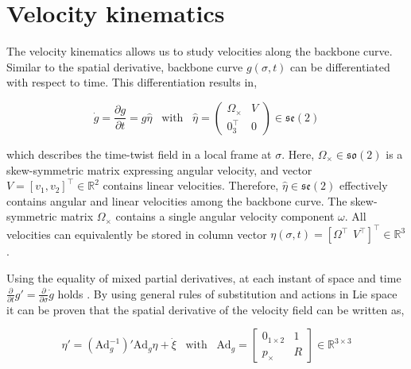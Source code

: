 \section{Velocity kinematics}

The velocity kinematics allows us to study velocities along the backbone curve. Similar to the spatial derivative, backbone curve $g(\sigma,t)$ can be differentiated with respect to time. This differentiation results in, 

\begin{equation}
  \Dot{g} = \frac{\partial g}{\partial t} = g \hat{\eta} \hspace{10pt} \text{with} \hspace{10pt}  \hat{\eta} = \begin{pmatrix} \Omega_\times & V \\ 0_3^\top & 0 \end{pmatrix} \in  \mathfrak{se}(2)
    \label{eq2:dgdt}
\end{equation}

which describes the time-twist field in a local frame at $\sigma$. Here, $\Omega_\times \in \mathfrak{so}(2)$ is a skew-symmetric matrix expressing angular velocity, and vector $V = [v_1,v_2]^\top \in \mathbb{R}^2$ contains linear velocities. Therefore, $\hat{\eta} \in \mathfrak{se}(2)$ effectively contains angular and linear velocities among the backbone curve. The skew-symmetric matrix $\Omega_\times$ contains a single angular velocity component $\omega$. All velocities can equivalently be stored in column vector $\eta(\sigma,t) = [\Omega^\top \hspace{5pt} V^\top]^\top \in \mathbb{R}^3$ \cite{Sola2018}.

Using the equality of mixed partial derivatives, at each instant of space and time $\frac{\partial}{\partial t}g' = \frac{\partial}{\partial \sigma}\dot{g}$ holds \cite{Caasenbrood2020}. By using general rules of substitution and actions in Lie space it can be proven that the spatial derivative of the velocity field can be written as,

\begin{equation}
    \eta'= (\text{Ad}_g^{-1})'\text{Ad}_g \eta + \Dot{\xi} \hspace{10pt} \text{with} \hspace{10pt} \text{Ad}_g = \begin{bmatrix} 0_{1 \times 2} & 1 \\ p_\times & R  \end{bmatrix} \in \mathbb{R}^{3\times 3}
    \label{eq2:etadif}
\end{equation}


